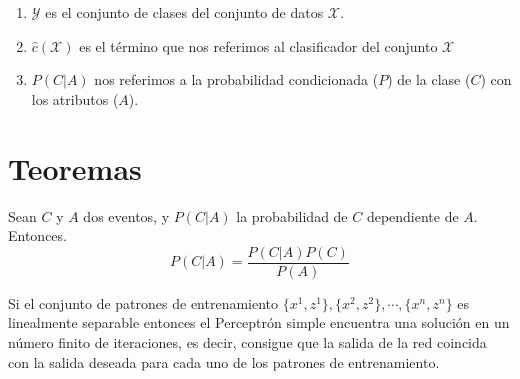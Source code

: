 


\begin{enumerate}
    \item $\mathcal{Y}$ es el conjunto de clases del conjunto de datos $\mathcal{X}$.
    \item $\hat{c}(\mathcal{X})$ es el término que nos referimos al clasificador del conjunto $\mathcal{X}$
    \item $P(C|A)$ nos referimos a la probabilidad condicionada ($P$) de la clase ($C$) con los atributos ($A$).
\end{enumerate}


\chapter*{Teoremas}


\begin{theorem}[Bayes]
    \label{theorem:bayes}
    Sean $C$ y $A$ dos eventos, y $P(C|A)$ la probabilidad de $C$ dependiente de $A$. Entonces.
    \[ P(C|A) = \frac{P(C|A) P(C)}{P(A)} \]
\end{theorem}

\begin{theorem}
    \label{theorem:ConvergenciaRosenblatt}
    Si el conjunto de patrones de entrenamiento $ \{x^{1}, z^{1}\}, \{x^{2}, z^{2}\}, \cdots, \{x^{n}, z^{n}\} $ es linealmente separable entonces el Perceptrón simple encuentra una solución en un número finito de iteraciones, es decir, consigue que la salida de la red coincida con la salida deseada para cada uno de los patrones de entrenamiento.
\end{theorem}